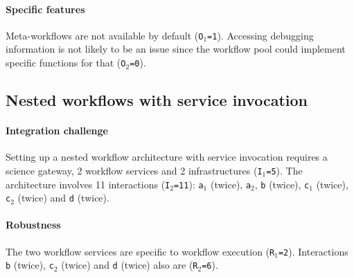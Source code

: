\documentclass[preprint,3p,twocolumn]{elsarticle}
\newcommand{\note}[2]{\pdfmargincomment[color=yellow,author=#1,open=true]{#2}}
\newcommand{\closednote}[4]{} %
\newcommand{\closedanswerednote}[6]{}
\begin{document}
\paragraph{Specific features} Meta-workflows are not available by default
(\texttt{O$_1$=1}).  Accessing debugging information is not likely to
be an issue since the workflow pool could implement specific functions
for that (\texttt{O$_2$=0}).

\subsection{Nested workflows with service invocation}

\paragraph{Integration challenge} Setting up a nested workflow
architecture with service invocation requires a science gateway, 2
workflow services and 2 infrastructures (\texttt{I$_1$=5}). The
architecture involves 11 interactions (\texttt{I$_2$=11}):
\texttt{a$_1$} (twice), \texttt{a$_2$}, \texttt{b} (twice), \texttt{c$_1$} (twice),
\texttt{c$_2$} (twice) and
\texttt{d} (twice).
\closedanswerednote{Rafael}{I like the idea of what has been discussed in
  the `integration effort', however I think the name may lead to
  misinterpretations. For example, according to Table 2, it requires
  more effort to integrate in a Tight architecture than in a
  service-based architecture. Considering the principles of software
  engineer, it is simpler to integrate/maintain a system using
  decoupled services. Maybe it should be renamed to something related
  to 'dependencies'.}{Tristan}{In our scope I'm not sure that it's
  simpler to integrate a service architecture than a tightly
  integrated one. But I take your point. 'Dependencies' is not very
  suitable either. What about 'development effort'?}{Tristan}{Replaced
  'Integration effort' with 'global complexity', as discussed in
  github issue \#8.} 

\paragraph{Robustness} The two workflow services are specific to
workflow execution (\texttt{R$_1$=2}). Interactions \texttt{b}
(twice), \texttt{c$_2$} (twice) and \texttt{d} (twice) also
are (\texttt{R$_2$=6}).
\closednote{Marc-e}{I understand both points. However, complexity is
  addressed in Robustness as well... I liked the idea of development effort. It's a tough call.}{Tristan}{Maybe 'integration challenge' is a good compromise.}
\end{document}

